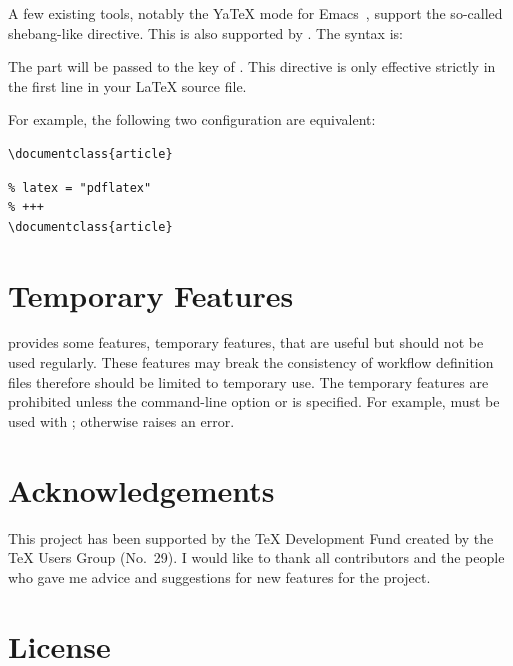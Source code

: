 \documentclass{llmk-doc}
\begin{document}
A few existing tools, notably the YaTeX mode for Emacs~\cite{yatex}, support
the so-called shebang-like directive. This is also supported by .
The syntax is:
%
\begin{htcode}
\end{htcode}
%
The  part will be passed to the  key of .
This directive is only effective strictly in the first line in your {\LaTeX}
source file.

For example, the following two configuration are equivalent:\\
%
\begin{minipage}[t]{.5\textwidth}
\begin{lstlisting}[style=latex]
%#!pdflatex
\documentclass{article}
\end{lstlisting}
\end{minipage}
\begin{minipage}[t]{.49\textwidth}
\begin{lstlisting}[style=latex]
% +++
% latex = "pdflatex"
% +++
\documentclass{article}
\end{lstlisting}
\end{minipage}

\section{Temporary Features}
\label{sec:temporary_features}
 provides some features, temporary features, that are
useful but should not be used regularly. These features may break the
consistency of workflow definition files therefore should be limited
to temporary use. The temporary features are prohibited unless the
command-line option  or  is specified. For
example,  must be used with ; otherwise
 raises an error.

\section{Acknowledgements}

This project has been supported by the {\TeX} Development Fund created by the {\TeX}
Users Group (No.~29). I would like to thank all contributors and the people who
gave me advice and suggestions for new features for the  project.

\section{License}
\end{document}
